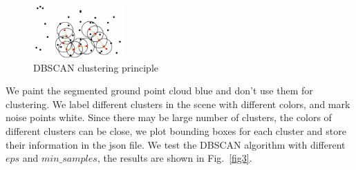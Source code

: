 \documentclass[8pt]{article}
\theoremstyle{nonumberplain}
\begin{document}
\begin{figure}[H]
	\centering
	\includegraphics[width=3.5cm]{fig2.png}
	\caption{DBSCAN clustering principle}
	\label{fig2}
\end{figure} 

We paint the segmented ground point cloud blue and don't use them for clustering. We label different clusters in the scene with different colors, and mark noise points white. Since there may be large number of clusters, the colors of different clusters can be close, we plot bounding boxes for each cluster and store their information in the json file. We test the DBSCAN algorithm with different $eps$ and $min\_samples$, the results are shown in Fig.~\ref{fig3}.
\end{document}
